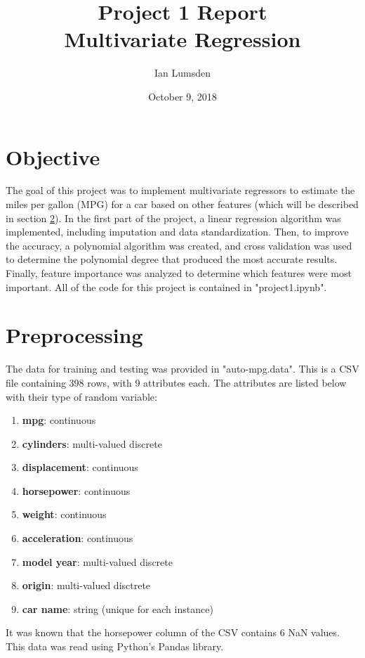 \documentclass[12pt]{article}
\title{Project 1 Report\\
Multivariate Regression}
\date{October 9, 2018}
\author{Ian Lumsden}
\begin{document}
	
	\maketitle
	\newpage
	
	\setlength{\parskip}{0cm}
	
	\section{Objective} \label{objective}
	
	The goal of this project was to implement multivariate regressors to estimate the miles per gallon (MPG) for a car based on other features (which will be described in section \ref{preprocessing}). In the first part of the project, a linear regression algorithm was implemented, including imputation and data standardization. Then, to improve the accuracy, a polynomial algorithm was created, and cross validation was used to determine the polynomial degree that produced the most accurate results. Finally, feature importance was analyzed to determine which features were most important. All of the code for this project is contained in "project1.ipynb".
	
	\section{Preprocessing} \label{preprocessing}
	
	The data for training and testing was provided in "auto-mpg.data". This is a CSV file containing 398 rows, with 9 attributes each. The attributes are listed below with their type of random variable:
	\begin{enumerate}
		\item \textbf{mpg}: continuous
		\item \textbf{cylinders}: multi-valued discrete
		\item \textbf{displacement}: continuous
		\item \textbf{horsepower}: continuous
		\item \textbf{weight}: continuous
		\item \textbf{acceleration}: continuous
		\item \textbf{model year}: multi-valued discrete
		\item \textbf{origin}: multi-valued disctrete
		\item \textbf{car name}: string (unique for each instance)
	\end{enumerate}
    It was known that the horsepower column of the CSV contains 6 NaN values. This data was read using Python's Pandas library.
    
\end{document}
